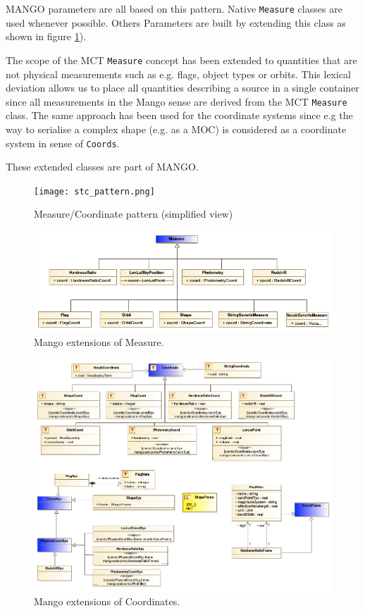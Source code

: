 \documentclass[11pt,a4paper]{ivoa}
\begin{document}
\begin{itemize}
MANGO parameters are all based on this pattern.
Native  \texttt{Measure} classes are used whenever possible.
Others Parameters are built by extending this class as shown in figure \ref{fig:stcpattern}).

The scope of the MCT \texttt{Measure}  concept has been extended to quantities that are not physical measurements such as e.g. flags, object types or orbits.
This lexical deviation allows us to place all quantities describing a source in a single container since all measurements in the Mango sense are derived from the MCT \texttt{Measure} class.
The same approach has been used for the coordinate systems since e.g the way to serialise a complex shape (e.g. as a MOC) is considered as a coordinate system in sense of \texttt{Coords}.

These extended classes are part of MANGO.
\begin{figure}
     \texttt{[image: stc\_pattern.png]}
     \caption{Measure/Coordinate pattern (simplified view)}
     \label{fig:stcpattern}
\end{figure}

\begin{figure}
  \includegraphics[width=1.0\textwidth]{../model/mangoMeasures.png}
  \caption{Mango extensions of Measure.}
  \label{fig:measures}
\end{figure}

\begin{figure}
  \includegraphics[width=1.0\textwidth]{../model/mangoCoordinates.png}
  \caption{Mango extensions of Coordinates.}
  \label{fig:coordinates}
\end{figure}


\end{itemize}
\end{document}
